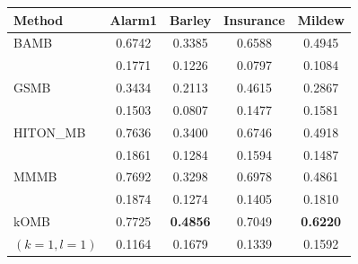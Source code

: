 \setlength{\tabcolsep}{5pt}
\begin{tabular}{lcccc}
\toprule
Method & Alarm1 & Barley & Insurance & Mildew \\
\midrule

BAMB 
& 0.6742 & 0.3385 & 0.6588 & 0.4945 \\
& {\scriptsize 0.1771} & {\scriptsize 0.1226} & {\scriptsize 0.0797} & {\scriptsize 0.1084} \\

GSMB 
& 0.3434 & 0.2113 & 0.4615 & 0.2867 \\
& {\scriptsize 0.1503} & {\scriptsize 0.0807} & {\scriptsize 0.1477} & {\scriptsize 0.1581} \\

HITON\_MB 
& 0.7636 & 0.3400 & 0.6746 & 0.4918 \\
& {\scriptsize 0.1861} & {\scriptsize 0.1284} & {\scriptsize 0.1594} & {\scriptsize 0.1487} \\



MMMB 
& 0.7692 & 0.3298 & 0.6978 & 0.4861 \\
& {\scriptsize 0.1874} & {\scriptsize 0.1274} & {\scriptsize 0.1405} & {\scriptsize 0.1810} \\



kOMB
& 0.7725 & \textbf{0.4856} & 0.7049 & \textbf{0.6220} \\
{\scriptsize $(k=1,l=1)$}& {\scriptsize 0.1164} & {\scriptsize 0.1679} & {\scriptsize 0.1339} & {\scriptsize 0.1592} \\


\end{tabular}
